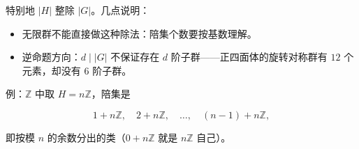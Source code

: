 特别地 $|H|$ 整除 $|G|$。几点说明：

\begin{itemize}
\item 无限群不能直接做这种除法：陪集个数要按基数理解。
\item 逆命题方向：$d\mid|G|$ 不保证存在 $d$ 阶子群——正四面体的旋转对称群有 $12$ 个元素，却没有 $6$ 阶子群。
\end{itemize}


例：$\mathbb Z$ 中取 $H=n\mathbb Z$，陪集是

\[1+n\mathbb Z,\quad 2+n\mathbb Z,\quad\ldots,\quad(n-1)+n\mathbb Z,\]

即按模 $n$ 的余数分出的类（$0+n\mathbb Z$ 就是 $n\mathbb Z$ 自己）。
